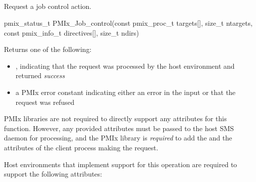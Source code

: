 \subsection{}

\summary

Request a job control action.

\format

\cspecificstart
\begin{codepar}
pmix_status_t
PMIx_Job_control(const pmix_proc_t targets[], size_t ntargets,
                 const pmix_info_t directives[], size_t ndirs)
\end{codepar}
\cspecificend

\begin{arglist}
\end{arglist}

Returns one of the following:

\begin{itemize}
    \item {}, indicating that the request was processed by the host environment and returned \textit{success}
    \item a \ac{PMIx} error constant indicating either an error in the input or that the request was refused
\end{itemize}

\reqattrstart
\ac{PMIx} libraries are not required to directly support any attributes for this function. However, any provided attributes must be passed to the host \ac{SMS} daemon for processing, and the \ac{PMIx} library is \textit{required} to add the  and the  attributes of the client process making the request.

\divider

Host environments that implement support for this operation are required to support the following attributes:


